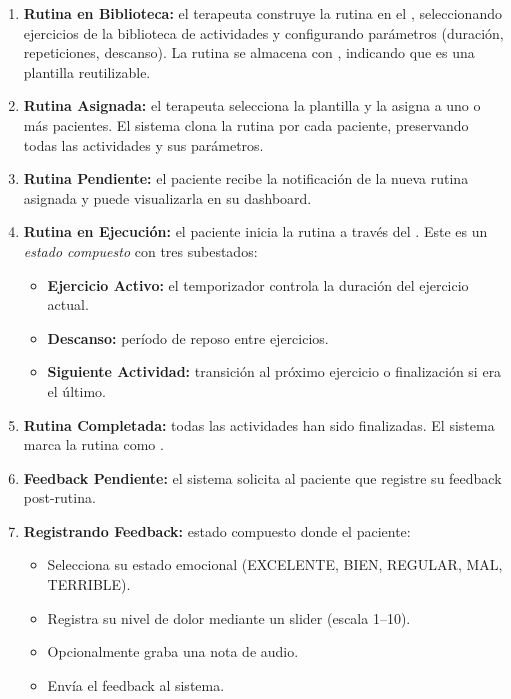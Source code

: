 \begin{enumerate}
  \item \textbf{Rutina en Biblioteca:} el terapeuta construye la rutina en el , seleccionando ejercicios de la biblioteca de actividades y configurando parámetros (duración, repeticiones, descanso). La rutina se almacena con , indicando que es una plantilla reutilizable.

  \item \textbf{Rutina Asignada:} el terapeuta selecciona la plantilla y la asigna a uno o más pacientes. El sistema clona la rutina por cada paciente, preservando todas las actividades y sus parámetros.

  \item \textbf{Rutina Pendiente:} el paciente recibe la notificación de la nueva rutina asignada y puede visualizarla en su dashboard.

  \item \textbf{Rutina en Ejecución:} el paciente inicia la rutina a través del . Este es un \emph{estado compuesto} con tres subestados:
  \begin{itemize}
    \item \textbf{Ejercicio Activo:} el temporizador controla la duración del ejercicio actual.
    \item \textbf{Descanso:} período de reposo entre ejercicios.
    \item \textbf{Siguiente Actividad:} transición al próximo ejercicio o finalización si era el último.
  \end{itemize}

  \item \textbf{Rutina Completada:} todas las actividades han sido finalizadas. El sistema marca la rutina como .

  \item \textbf{Feedback Pendiente:} el sistema solicita al paciente que registre su feedback post-rutina.

  \item \textbf{Registrando Feedback:} estado compuesto donde el paciente:
  \begin{itemize}
    \item Selecciona su estado emocional (EXCELENTE, BIEN, REGULAR, MAL, TERRIBLE).
    \item Registra su nivel de dolor mediante un slider (escala 1--10).
    \item Opcionalmente graba una nota de audio.
    \item Envía el feedback al sistema.
  \end{itemize}


\end{enumerate}
